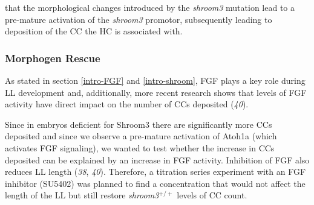 \documentclass[11pt,singlespacinge,twoside]{reedthesis} %
\theoremstyle{definition}
\theoremstyle{definition}
\theoremstyle{definition}
\theoremstyle{remark}
\begin{document}
that the morphological changes introduced by the \emph{shroom3} mutation lead to a pre-mature activation of the \emph{shroom3} promotor, subsequently leading to deposition of the CC the HC is associated with.

\hypertarget{morphogen-rescue}{%
\subsubsection{Morphogen Rescue}\label{morphogen-rescue}}

As stated in section \ref{intro-FGF} and \ref{intro-shroom}, FGF plays a key role during LL development and, additionally, more recent research shows that levels of FGF activity have direct impact on the number of CCs deposited (\emph{40}).

Since in embryos deficient for Shroom3 there are significantly more CCs deposited and since we observe a pre-mature activation of Atoh1a (which activates FGF signaling), we wanted to test whether the increase in CCs deposited can be explained by an increase in FGF activity. Inhibition of FGF also reduces LL length (\emph{38}, \emph{40}). Therefore, a titration series experiment with an FGF inhibitor (SU5402) was planned to find a concentration that would not affect the length of the LL but still restore \emph{shroom3}\(^{+/+}\) levels of CC count.\newline
\end{document}
